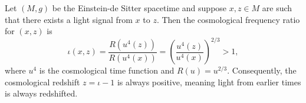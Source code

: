 Let $(M, g)$ be the Einstein-de Sitter spacetime and suppose $x, z \in M$ are such that there exists a light signal from $x$ to $z$. Then the cosmological frequency ratio for $(x, z)$ is
$$\iota(x, z) = \frac{R(u^4(z))}{R(u^4(x))} = \left( \frac{u^4(z)}{u^4(x)} \right)^{2/3} > 1,$$
where $u^4$ is the cosmological time function and $R(u) = u^{2/3}$. Consequently, the cosmological redshift $z = \iota - 1$ is always positive, meaning light from earlier times is always redshifted.
